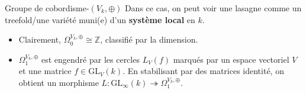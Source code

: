 \documentclass[12pt]{beamer}
\begin{document}
\begin{frame}{Groupe de cobordisme-$(V_k,\oplus)$}
   Dans ce cas, on peut voir une lasagne comme un treefold/une variété muni(e) d’un \textbf{système local} en $k$.
  \pause
\begin{itemize}
  \item Clairement, $\Omega^{V_k,\oplus}_0\cong \mathbb{Z}$, classifié par la dimension.
  \pause

\item $\Omega^{V_k,\oplus}_1$ est engendré par les cercles $L_V(f)$ marqués par un espace vectoriel $V$ et une matrice $f\in \mathrm{GL}_V(k)$. En stabilisant par des matrices identité, on obtient un morphisme $L:\mathrm{GL}_{\infty}(k) \twoheadrightarrow \Omega^{V_k,\oplus}_1$.

\end{itemize}
  \begin{center}
    



\begin{tikzpicture}[x=0.75pt,y=0.75pt,yscale=-1,xscale=1]


\end{tikzpicture}
\end{center}
\end{frame}
\end{document}

